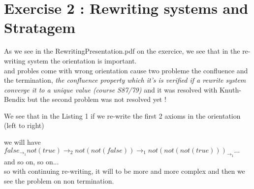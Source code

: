 \begin{enumerate}
\begin{itemize}
\end{itemize}
\end{enumerate}
\section{Exercise 2 : Rewriting systems and Stratagem}
As we see in the RewritingPresentation.pdf on the exercice, we see that in the re-writing system the orientation is important. \\
and probles come with wrong orientation cause two probleme the confluence and the termination, \textit{the confluence property which it's is verified if a rewrite system converge it to a unique value (course S87/79)} and it was resolved with Knuth-Bendix but the second problem was not resolved yet \frownie{}!

We see that in the Listing 1 if we re-write the first 2 axioms in the orientation (left to right)

we will have
$false_{\rightarrow_1}not(true){\rightarrow_2} not(not(false)){\rightarrow_1} not(not(not(true)))_{\rightarrow_1}...$  and so on, so on...\\
so with continuing re-writing, it will to be more and more complex and then we see the problem on non termination. 

